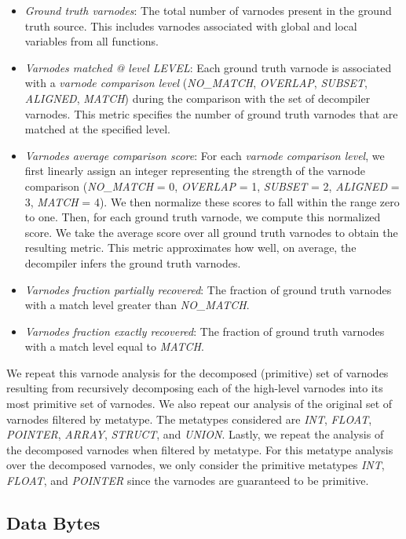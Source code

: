 \begin{itemize}
    \item \emph{Ground truth varnodes}: The total number of varnodes present in the ground truth source. This includes varnodes associated with global and local variables from all functions.
    \item \emph{Varnodes matched @ level LEVEL}: Each ground truth varnode is associated with a \emph{varnode comparison level} (\emph{NO\_MATCH}, \emph{OVERLAP}, \emph{SUBSET}, \emph{ALIGNED}, \emph{MATCH}) during the comparison with the set of decompiler varnodes. This metric specifies the number of ground truth varnodes that are matched at the specified level.
    \item \emph{Varnodes average comparison score}: For each \emph{varnode comparison level}, we first linearly assign an integer representing the strength of the varnode comparison (\emph{NO\_MATCH} = 0, \emph{OVERLAP} = 1, \emph{SUBSET} = 2, \emph{ALIGNED} = 3, \emph{MATCH} = 4). We then normalize these scores to fall within the range zero to one. Then, for each ground truth varnode, we compute this normalized score. We take the average score over all ground truth varnodes to obtain the resulting metric. This metric approximates how well, on average, the decompiler infers the ground truth varnodes.
    \item \emph{Varnodes fraction partially recovered}: The fraction of ground truth varnodes with a match level greater than \emph{NO\_MATCH}.
    \item \emph{Varnodes fraction exactly recovered}: The fraction of ground truth varnodes with a match level equal to \emph{MATCH}.
\end{itemize}

We repeat this varnode analysis for the decomposed (primitive) set of varnodes resulting from recursively decomposing each of the high-level varnodes into its most primitive set of varnodes. We also repeat our analysis of the original set of varnodes filtered by metatype. The metatypes considered are \emph{INT}, \emph{FLOAT}, \emph{POINTER}, \emph{ARRAY}, \emph{STRUCT}, and \emph{UNION}. Lastly, we repeat the analysis of the decomposed varnodes when filtered by metatype. For this metatype analysis over the decomposed varnodes, we only consider the primitive metatypes \emph{INT}, \emph{FLOAT}, and \emph{POINTER} since the varnodes are guaranteed to be primitive.



\subsection{Data Bytes}

